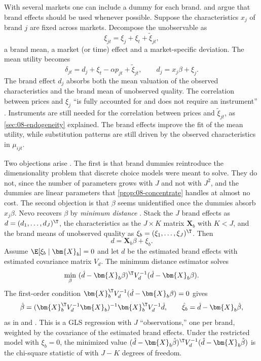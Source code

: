 With several markets one can include a dummy for each brand. \citet[pp.~536--538]{Nevo2000a} and
\citet[pp.~322--323]{Nevo2001} argue that brand effects should be used whenever possible. Suppose the
characteristics $x_j$ of brand $j$ are fixed across markets. Decompose the unobservable as
\begin{equation*}
  \xi_{jt} = \xi_j + \xi_t + \tilde\xi_{jt},
\end{equation*}
a brand mean, a market (or time) effect and a market-specific deviation. The mean utility becomes
\begin{equation*}
  \delta_{jt} = d_j + \xi_t - \alpha p_{jt} + \tilde\xi_{jt}, \qquad d_j = x_j\beta + \xi_j.
\end{equation*}
The brand effect $d_j$ absorbs both the mean valuation of the observed characteristics and the brand mean of
unobserved quality. The correlation between prices and $\xi_j$ ``is fully accounted for and does not require an
instrument'' \citep[p.~322]{Nevo2001}. Instruments are still needed for the correlation between prices and
$\tilde\xi_{jt}$, as \cref{sec:08-endogeneity} explained. The brand effects improve the fit of the mean
utility, while substitution patterns are still driven by the observed characteristics in $\mu_{ijt}$.

Two objections arise \citep[p.~537]{Nevo2000a}. The first is that brand dummies reintroduce the dimensionality
problem that discrete choice models were meant to solve. They do not, since the number of parameters grows with
$J$ and not with $J^2$, and the dummies are linear parameters that \cref{prop:08-concentrate} handles at almost
no cost. The second objection is that $\beta$ seems unidentified once the dummies absorb $x_j\beta$. Nevo
recovers $\beta$ by \emph{minimum distance} \citep{Chamberlain1982}. Stack the $J$ brand effects as $d = (d_1,
\dots, d_J)^\T$, the characteristics as the $J \times K$ matrix $\bm{X}_b$ with $K < J$, and the brand means
of unobserved quality as $\xi_b = (\xi_1, \dots, \xi_J)^\T$. Then
\begin{equation*}
  d = \bm{X}_b\beta + \xi_b.
\end{equation*}
Assume $\E[\xi_b \mid \bm{X}_b] = 0$ and let $\hat d$ be the estimated brand effects with estimated covariance
matrix $V_d$. The minimum distance estimator solves
\begin{equation*}
  \min_\beta\ (\hat d - \bm{X}_b\beta)^\T V_d^{-1}(\hat d - \bm{X}_b\beta).
\end{equation*}
The first-order condition $\bm{X}_b^\T V_d^{-1}(\hat d - \bm{X}_b\beta) = 0$ gives
\begin{equation}\label{eq:08-md}
  \hat\beta = (\bm{X}_b^\T V_d^{-1}\bm{X}_b)^{-1}\bm{X}_b^\T V_d^{-1}\hat d, \qquad \hat\xi_b = \hat d -
  \bm{X}_b\hat\beta,
\end{equation}
as in \citet[p.~537]{Nevo2000a} and \citet[p.~322]{Nevo2001}. This is a GLS regression with $J$
``observations,'' one per brand, weighted by the covariance of the estimated brand effects. Under the
restricted model with $\xi_b = 0$, the minimized value $(\hat d - \bm{X}_b\hat\beta)^\T V_d^{-1}(\hat d -
\bm{X}_b\hat\beta)$ is the chi-square statistic of \citet{Chamberlain1982} with $J - K$ degrees of freedom.

